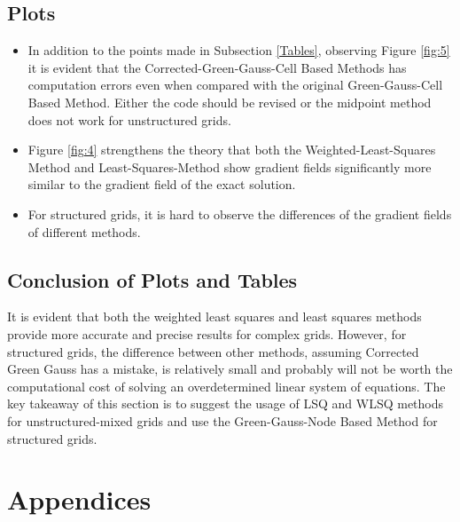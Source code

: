 \documentclass{article}
\begin{document}
\subsection{Plots}
\begin{itemize}
    \item In addition to the points made in Subsection \ref{Tables}, observing Figure \ref{fig:5} it is evident that the Corrected-Green-Gauss-Cell Based Methods has computation errors even when compared with the original Green-Gauss-Cell Based Method. Either the code should be revised or the midpoint method does not work for unstructured grids.
    \item Figure \ref{fig:4} strengthens the theory that both the Weighted-Least-Squares Method and Least-Squares-Method show gradient fields significantly more similar to the gradient field of the exact solution.
    \item For structured grids, it is hard to observe the differences of the gradient fields of different methods.
\end{itemize}
\subsection{Conclusion of Plots and Tables}
    It is evident that both the weighted least squares and least squares methods provide more accurate and precise results for complex grids. However, for structured grids, the difference between other methods, assuming Corrected Green Gauss has a mistake, is relatively small and probably will not be worth the computational cost of solving an overdetermined linear system of equations. The key takeaway of this section is to suggest the usage of LSQ and WLSQ methods for unstructured-mixed grids and use the Green-Gauss-Node Based Method for structured grids.


\newpage
\section*{Appendices}
\label{Appendices}
\end{document}
